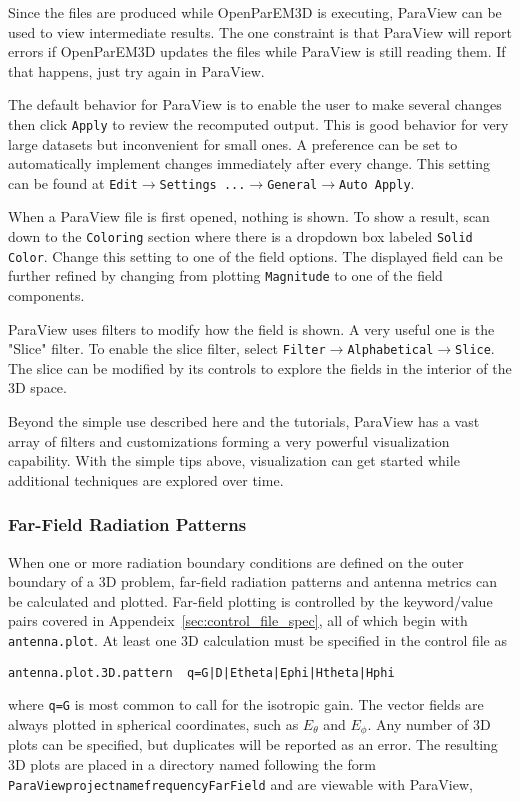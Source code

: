 \documentclass[titlepage]{article}
\renewcommand\_{\textunderscore\linebreak[1]}
\begin{document}
Since the files are produced while OpenParEM3D is executing, ParaView can be used to view intermediate results.  The one constraint is that ParaView will report errors if OpenParEM3D updates the files while ParaView is still reading them.  If that happens, just try again in ParaView.

The default behavior for ParaView is to enable the user to make several changes then click \texttt{Apply} to review the recomputed output.  This is good behavior for very large datasets but inconvenient for small ones.  A preference can be set to automatically implement changes immediately after every change.  This setting can be found at \texttt{Edit}$\rightarrow$\texttt{Settings ...}$\rightarrow$\texttt{General}$\rightarrow$\texttt{Auto Apply}.

When a ParaView file is first opened, nothing is shown.  To show a result, scan down to the \texttt{Coloring} section where there is a dropdown box labeled \texttt{Solid Color}.  Change this setting to one of the field options.  The displayed field can be further refined by changing from plotting \texttt{Magnitude} to one of the field components.

ParaView uses filters to modify how the field is shown.  A very useful one is the "Slice" filter.  To enable the slice filter, select \texttt{Filter}$\rightarrow$\texttt{Alphabetical}$\rightarrow$\texttt{Slice}.  The slice can be modified by its controls to explore the fields in the interior of the 3D space.

Beyond the simple use described here and the tutorials, ParaView has a vast array of filters and customizations forming a very powerful visualization capability. With the simple tips above, visualization can get started while additional techniques are explored over time.

\subsubsection{Far-Field Radiation Patterns}
\label{sec:viewff}

When one or more radiation boundary conditions are defined on the outer boundary of a 3D problem, far-field radiation patterns and antenna metrics can be calculated and plotted.  Far-field plotting is controlled by the keyword/value pairs covered in Appendeix~\ref{sec:control_file_spec}, all of which begin with \texttt{antenna.plot}. 
At least one 3D calculation must be specified in the control file as
\begin{Verbatim}[fontsize=\small]
  antenna.plot.3D.pattern  q=G|D|Etheta|Ephi|Htheta|Hphi
\end{Verbatim}
\noindent where \texttt{q=G} is most common to call for the isotropic gain.  The vector fields are always plotted in spherical coordinates, such as $E_\theta$ and $E_\phi$.  Any number of 3D plots can be specified, but duplicates will be reported as an error.  The resulting 3D plots are placed in a directory named following the form \texttt{ParaView\_projectname\_frequency\_FarField} and are viewable with ParaView, 
\end{document}
